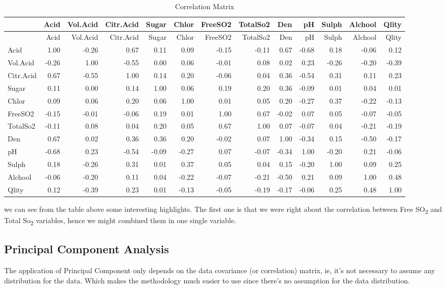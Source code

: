 \documentclass[]{article}
\begin{document}
\begin{longtable}[c]{@{}lrrrrrrrrrrrr@{}}
\caption{Correlation Matrix}\tabularnewline
\toprule
& Acid & Vol.Acid & Citr.Acid & Sugar & Chlor & FreeSO2 & TotalSo2 & Den
& pH & Sulph & Alchool & Qlity\tabularnewline
\midrule
\endfirsthead
\toprule
& Acid & Vol.Acid & Citr.Acid & Sugar & Chlor & FreeSO2 & TotalSo2 & Den
& pH & Sulph & Alchool & Qlity\tabularnewline
\midrule
\endhead
Acid & 1.00 & -0.26 & 0.67 & 0.11 & 0.09 & -0.15 & -0.11 & 0.67 & -0.68
& 0.18 & -0.06 & 0.12\tabularnewline
Vol.Acid & -0.26 & 1.00 & -0.55 & 0.00 & 0.06 & -0.01 & 0.08 & 0.02 &
0.23 & -0.26 & -0.20 & -0.39\tabularnewline
Citr.Acid & 0.67 & -0.55 & 1.00 & 0.14 & 0.20 & -0.06 & 0.04 & 0.36 &
-0.54 & 0.31 & 0.11 & 0.23\tabularnewline
Sugar & 0.11 & 0.00 & 0.14 & 1.00 & 0.06 & 0.19 & 0.20 & 0.36 & -0.09 &
0.01 & 0.04 & 0.01\tabularnewline
Chlor & 0.09 & 0.06 & 0.20 & 0.06 & 1.00 & 0.01 & 0.05 & 0.20 & -0.27 &
0.37 & -0.22 & -0.13\tabularnewline
FreeSO2 & -0.15 & -0.01 & -0.06 & 0.19 & 0.01 & 1.00 & 0.67 & -0.02 &
0.07 & 0.05 & -0.07 & -0.05\tabularnewline
TotalSo2 & -0.11 & 0.08 & 0.04 & 0.20 & 0.05 & 0.67 & 1.00 & 0.07 &
-0.07 & 0.04 & -0.21 & -0.19\tabularnewline
Den & 0.67 & 0.02 & 0.36 & 0.36 & 0.20 & -0.02 & 0.07 & 1.00 & -0.34 &
0.15 & -0.50 & -0.17\tabularnewline
pH & -0.68 & 0.23 & -0.54 & -0.09 & -0.27 & 0.07 & -0.07 & -0.34 & 1.00
& -0.20 & 0.21 & -0.06\tabularnewline
Sulph & 0.18 & -0.26 & 0.31 & 0.01 & 0.37 & 0.05 & 0.04 & 0.15 & -0.20 &
1.00 & 0.09 & 0.25\tabularnewline
Alchool & -0.06 & -0.20 & 0.11 & 0.04 & -0.22 & -0.07 & -0.21 & -0.50 &
0.21 & 0.09 & 1.00 & 0.48\tabularnewline
Qlity & 0.12 & -0.39 & 0.23 & 0.01 & -0.13 & -0.05 & -0.19 & -0.17 &
-0.06 & 0.25 & 0.48 & 1.00\tabularnewline
\bottomrule
\end{longtable}

we can see from the table above some interesting highlights. The first
one is that we were right about the correlation between Free
SO\textsubscript{2} and Total So\textsubscript{2} variables, hence we
might combined them in one single variable.

\subsection{Principal Component
Analysis}\label{principal-component-analysis}

The application of Principal Component only depends on the data
covariance (or correlation) matrix, ie, it's not necessary to assume any
distribution for the data. Which makes the methodology much easier to
use since there's no assumption for the data distribution.\cite{pca}
\end{document}
